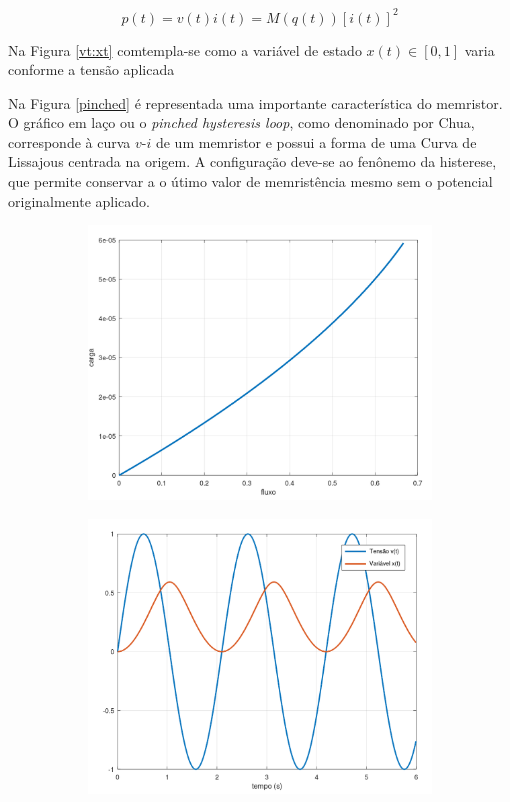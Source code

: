 \documentclass{ceel}
\begin{document}
\begin{multicols}{2}
\begin{equation}\label{pot}
p(t) = v(t)i(t)=M(q(t))[i(t)]^2
\end{equation}

Na Figura \ref{vt:xt} comtempla-se como a variável de estado $x(t)\in[0,1]$ varia conforme a tensão aplicada %

Na Figura \ref{pinched} é representada uma importante característica do memristor. O gráfico em laço ou o \emph{pinched hysteresis loop}, como denominado por Chua, corresponde à curva  $v$-$i$ de um memristor e possui a forma de uma Curva de Lissajous centrada na origem. A configuração deve-se ao fenônemo da histerese, que permite conservar a o útimo valor de memristência mesmo sem o potencial originalmente aplicado.

\begin{figure}[ht]
\begin{subfigure}{0.33\textwidth}
\includegraphics[width=\columnwidth]{flux-charge}
\caption{} \label{flux-charge}
\end{subfigure}
\hfill
\begin{subfigure}{0.33\textwidth}
\includegraphics[width=\columnwidth]{vt-xt}

\end{subfigure}
\end{figure}
\end{multicols}
\end{document}
